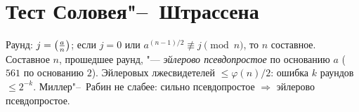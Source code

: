\documentclass{ca-handout}
\begin{document}
\section{Тест Соловея"--~Штрассена}
Раунд: $j = \left(\frac{a}{n}\right)$; если $j = 0$ или $a^{(n-1)/2} \not\equiv j \pmod n$, то $n$ составное.
Составное $n$, прошедшее раунд, "--- \emph{эйлерово псевдопростое} по основанию $a$
($561$ по основанию $2$). Эйлеровых лжесвидетелей $\le \varphi(n)/2$: ошибка $k$ раундов
$\le 2^{-k}$. Миллер"--~Рабин не слабее: сильно псевдопростое $\Rightarrow$ эйлерово псевдопростое.
\end{document}
